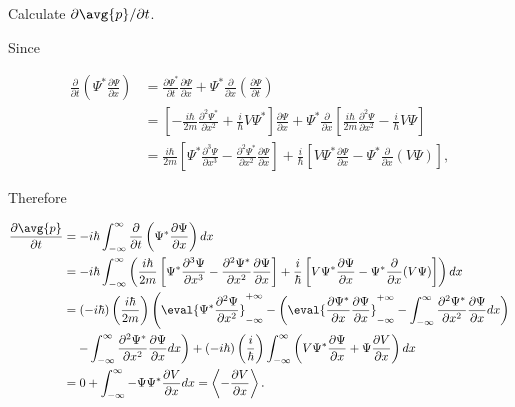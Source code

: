 \documentclass[a4paper,12pt]{report}
\begin{document}
{Calculate \(\partial \avg{p} /\partial t  \).}
{Since 
		
\begin{equation}
	\begin{aligned}
		\frac{\partial}{\partial t}\left(\Psi^* \frac{\partial \Psi}{\partial x}\right) & =\frac{\partial \Psi^*}{\partial t} \frac{\partial \Psi}{\partial x}+\Psi^* \frac{\partial}{\partial x}\left(\frac{\partial \Psi}{\partial t}\right) \\
		& =\left[-\frac{i \hbar}{2 m} \frac{\partial^2 \Psi^*}{\partial x^2}+\frac{i}{\hbar} V \Psi^*\right] \frac{\partial \Psi}{\partial x}+\Psi^* \frac{\partial}{\partial x}\left[\frac{i \hbar}{2 m} \frac{\partial^2 \Psi}{\partial x^2}-\frac{i}{\hbar} V \Psi\right] \\
		& =\frac{i \hbar}{2 m}\left[\Psi^* \frac{\partial^3 \Psi}{\partial x^3}-\frac{\partial^2 \Psi^*}{\partial x^2} \frac{\partial \Psi}{\partial x}\right]+\frac{i}{\hbar}\left[V \Psi^* \frac{\partial \Psi}{\partial x}-\Psi^* \frac{\partial}{\partial x}(V \Psi)\right],
	\end{aligned}
\end{equation}
		
Therefore

\begin{equation}
  \begin{aligned}
      \frac{\partial \avg{p}}{\partial t} &= -i\hbar \int_{-\infty}^{\infty} \frac{\partial}{\partial t} \left(\Psi^* \frac{\partial \Psi}{\partial x} \right) dx \\ 
      &= -i\hbar \int_{-\infty}^{\infty} \left( \frac{i\hbar}{2m} \left[ \Psi^* \frac{\partial^3 \Psi}{\partial x^3} - \frac{\partial^2 \Psi^*}{\partial x^2} \frac{\partial \Psi}{\partial x} \right] 
      + \frac{i}{\hbar} \left[ V \Psi^* \frac{\partial \Psi}{\partial x} - \Psi^* \frac{\partial}{\partial x}(V \Psi) \right] \right) dx \\ 
      &= (-i\hbar) \left( \frac{i\hbar}{2m} \right) 
      \left( \eval{\Psi^* \frac{\partial^2 \Psi}{\partial x^2}}_{-\infty}^{+\infty} 
      - \left( \eval{\frac{\partial \Psi^*}{\partial x} \frac{\partial \Psi}{\partial x}}_{-\infty}^{+\infty} 
      - \int_{-\infty}^{\infty} \frac{\partial^2 \Psi^*}{\partial x^2} \frac{\partial \Psi}{\partial x} dx \right) \right. \\ 
      & \quad \left. - \int_{-\infty}^{\infty} \frac{\partial^2 \Psi^*}{\partial x^2} \frac{\partial \Psi}{\partial x} dx \right) 
      + (-i\hbar) \left( \frac{i}{\hbar} \right) 
      \int_{-\infty}^{\infty} \left( V \Psi^* \frac{\partial \Psi}{\partial x} + \Psi \frac{\partial V}{\partial x} \right) dx \\ 
      &= 0 + \int_{-\infty}^{\infty} -\Psi \Psi^* \frac{\partial V}{\partial x} dx = \left \langle {-\frac{\partial V}{\partial x} } \right \rangle. 
  \end{aligned}
  \end{equation}
	
}
\end{document}
